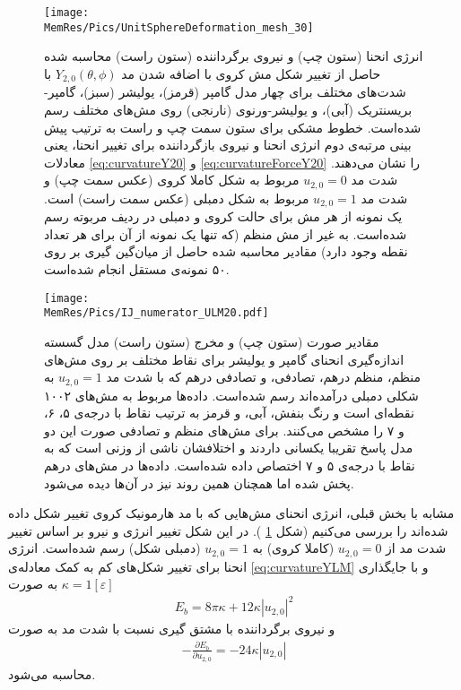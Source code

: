 \begin{figure}[htbp]
\begin{center}
\texttt{[image: \\MemRes/Pics/UnitSphereDeformation\_mesh\_30]}
\caption{
انرژی انحنا (ستون چپ) و نیروی برگرداننده (ستون راست) محاسبه‌ شده حاصل از تغییر شکل مش کروی با اضافه شدن مد
$Y_{2,0}(\theta,\phi)$
با شدت‌های مختلف برای چهار مدل گامپر (قرمز)، یولیشر (سبز)، گامپر-بریسنتریک (آبی)، و یولیشر-ورنوی (نارنجی) روی مش‌های مختلف رسم شده‌است. خطوط مشکی برای ستون سمت چپ و راست به ترتیب پیش بینی
 مرتبه‌ی دوم انرژی انحنا و نیروی بازگرداننده برای تغییر انحنا، یعنی معادلات
\ref{eq:curvatureY20}
و
\ref{eq:curvatureForceY20}
را نشان می‌دهند.  شدت مد 
$u_{2,0}=0$
مربوط به شکل کاملا کروی (عکس سمت چپ) و شدت مد 
$u_{2,0}=1$
مربوط به شکل دمبلی (عکس سمت راست) است. یک نمونه از هر مش برای حالت کروی و دمبلی در ردیف مربوته رسم شده‌است. به غیر از مش منظم (که تنها یک نمونه از آن برای هر تعداد نقطه وجود دارد) مقادیر محاسبه شده حاصل از میان‌گین گیری بر روی ۵۰ نمونه‌ی مستقل انجام شده‌است.
}
\label{fig:unitsphereBendingULM20}
\end{center}
\end{figure}

\begin{figure}[htbp]
\begin{center}
\texttt{[image: \\MemRes/Pics/IJ\_numerator\_ULM20.pdf]}
\caption{
مقادیر صورت (ستون چپ) و مخرج (ستون راست) مدل گسسته اندازه‌گیری انحنای گامپر و یولیشر برای نقاط مختلف بر روی مش‌های منظم، منظم درهم، تصادفی، و تصادفی درهم که با شدت مد 
$u_{2,0}=1$
به شکلی دمبلی درآمده‌اند رسم شده‌است. داده‌ها مربوط به مش‌های ۱۰۰۲ نقطه‌ای است و  رنگ بنفش، آبی، و قرمز به ترتیب  نقاط با درجه‌ی ۵، ۶، و ۷ را مشخص می‌کنند. برای مش‌های منظم و تصادفی صورت این دو مدل پاسخ تقریبا یکسانی داردند و اختلافشان ناشی از وزنی است که به نقاط با درجه‌ی ۵ و ۷ اختصاص داده شده‌است. داده‌ها در مش‌های درهم پخش شده اما همچنان همین روند نیز در آن‌ها دیده می‌شود.
}
\label{fig:ULM20BendingScatter}
\end{center}
\end{figure}

مشابه با بخش قبلی، انرژی انحنای مش‌هایی که با مد هارمونیک کروی تغییر شکل داده شده‌اند را بررسی می‌کنیم (شکل
\ref{fig:unitsphereBendingULM20}
). در این شکل تغییر انرژی و نیرو بر اساس تغییر شدت مد از
$u_{2,0}=0$
(کاملا کروی) به
$u_{2,0}=1$
(دمبلی شکل) رسم شده‌است. انرژی انحنا برای تغییر شکل‌های کم به کمک معادله‌ی 
\ref{eq:curvatureYLM}
 و با جایگذاری 
 $\kappa=1[\varepsilon]$
 به صورت
\begin{eqnarray}
E_{b}=8\pi\kappa + 12\kappa|u_{2,0}|^2
\label{eq:curvatureY20}
\end{eqnarray}
و نیروی برگرداننده با مشتق گیری نسبت با شدت مد به صورت
\begin{eqnarray}
-\frac{\partial E_{b}}{\partial u_{2,0}}= -24\kappa |u_{2,0}|
\label{eq:curvatureForceY20}
\end{eqnarray}
محاسبه می‌شود.


